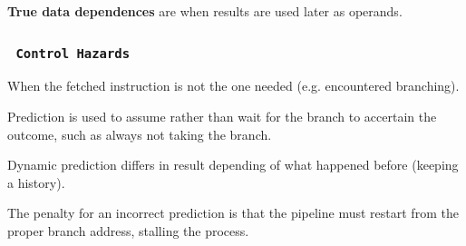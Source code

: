 \documentclass[11pt]{article}
\begin{document}
\textbf{True data dependences} are when results are used later as operands.

\pagebreak
\subsubsection*{\rightarrow \ \texttt{Control Hazards}}
\vspace{-0.5em}

When the fetched instruction is not the one needed (e.g. encountered branching).

Prediction is used to assume rather than wait for the branch to accertain the outcome, such as always not taking the branch.

Dynamic prediction differs in result depending of what happened before (keeping a history).

The penalty for an incorrect prediction is that the pipeline must restart from the proper branch address, stalling the process.
























































%
%
%
%
%
%
%
%
\end{document}
